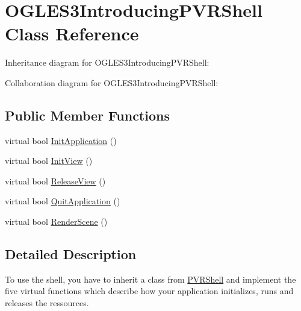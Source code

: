 \hypertarget{class_o_g_l_e_s3_introducing_p_v_r_shell}{\section{O\+G\+L\+E\+S3\+Introducing\+P\+V\+R\+Shell Class Reference}
\label{class_o_g_l_e_s3_introducing_p_v_r_shell}
}


Inheritance diagram for O\+G\+L\+E\+S3\+Introducing\+P\+V\+R\+Shell\+:


Collaboration diagram for O\+G\+L\+E\+S3\+Introducing\+P\+V\+R\+Shell\+:
\subsection*{Public Member Functions}
\begin{DoxyCompactItemize}
\item 
virtual bool \hyperlink{class_o_g_l_e_s3_introducing_p_v_r_shell_a9d102585f39ead58aad0b49b3ae584f6}{Init\+Application} ()
\item 
virtual bool \hyperlink{class_o_g_l_e_s3_introducing_p_v_r_shell_a30e84995029dba46ceb09f079f5abb13}{Init\+View} ()
\item 
virtual bool \hyperlink{class_o_g_l_e_s3_introducing_p_v_r_shell_af532b4024bfa5e3187262fa26d4efdef}{Release\+View} ()
\item 
virtual bool \hyperlink{class_o_g_l_e_s3_introducing_p_v_r_shell_a9c762024f0f7ca99f76aea61c0ef5fba}{Quit\+Application} ()
\item 
virtual bool \hyperlink{class_o_g_l_e_s3_introducing_p_v_r_shell_a7904fab3d5ab9b98232989ad0148aaa2}{Render\+Scene} ()
\end{DoxyCompactItemize}


\subsection{Detailed Description}


 To use the shell, you have to inherit a class from \hyperlink{class_p_v_r_shell}{P\+V\+R\+Shell} and implement the five virtual functions which describe how your application initializes, runs and releases the ressources. 

